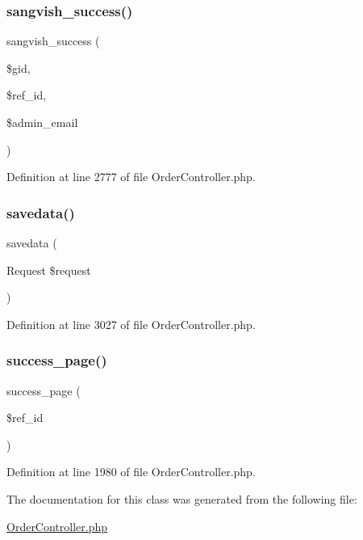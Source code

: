 \subsubsection{\texorpdfstring{sangvish\_success()}{sangvish\_success()}}
{\footnotesize\ttfamily sangvish\+\_\+success (\begin{DoxyParamCaption}\item[{}]{\$gid,  }\item[{}]{\$ref\+\_\+id,  }\item[{}]{\$admin\+\_\+email }\end{DoxyParamCaption})}



Definition at line 2777 of file Order\+Controller.\+php.

\mbox{\label{class_responsive_1_1_http_1_1_controllers_1_1_order_controller_a39992cc1c190dd16b2de573a70a7f5dc}} 
\subsubsection{\texorpdfstring{savedata()}{savedata()}}
{\footnotesize\ttfamily savedata (\begin{DoxyParamCaption}\item[{Request}]{\$request }\end{DoxyParamCaption})\hspace{0.3cm}{\ttfamily [protected]}}



Definition at line 3027 of file Order\+Controller.\+php.

\mbox{\label{class_responsive_1_1_http_1_1_controllers_1_1_order_controller_aff08e6d23e1e359171985625ca1d6b47}} 
\subsubsection{\texorpdfstring{success\_page()}{success\_page()}}
{\footnotesize\ttfamily success\+\_\+page (\begin{DoxyParamCaption}\item[{}]{\$ref\+\_\+id }\end{DoxyParamCaption})}



Definition at line 1980 of file Order\+Controller.\+php.



The documentation for this class was generated from the following file\+:\begin{DoxyCompactItemize}
\item 
\mbox{\hyperlink{_order_controller_8php}{Order\+Controller.\+php}}\end{DoxyCompactItemize}
